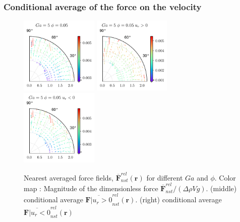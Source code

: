 \documentclass{sintefbeamer}
\newcommand{\nstrelavg}[1]{\overline{#1}_{nst}^{rel}}
\begin{document}
\begin{frame}
  \frametitle{Conditional average of the force on the velocity}
  \begin{figure}
    \centering
    \includegraphics[width=0.33\textwidth]{image/HOMOGENEOUS/fDrop/F_mu_r_0_1_Ga_5_PHI_0_05.pdf}
    \includegraphics[width=0.33\textwidth]{image/HOMOGENEOUS/fDrop/Fpos_mu_r_0_1_Ga_5_PHI_0_05.pdf}
    \includegraphics[width=0.33\textwidth]{image/HOMOGENEOUS/fDrop/Fneg_mu_r_0_1_Ga_5_PHI_0_05.pdf}
    \caption{Nearest averaged force fields, $\nstrelavg{\textbf{F}}(\textbf{r})$ for different $Ga$ and $\phi$. 
    Color map : Magnitude of the dimensionless force  $\nstrelavg{\textbf{F}} / (\Delta \rho V g)$.
    (middle) conditional average  $\nstrelavg{\textbf{F}| u_r > 0}(\textbf{r})$. 
    (right) conditional average  $\nstrelavg{\textbf{F}| u_r < 0}(\textbf{r})$ }
  \end{figure}
\end{frame}


  
\end{document}
